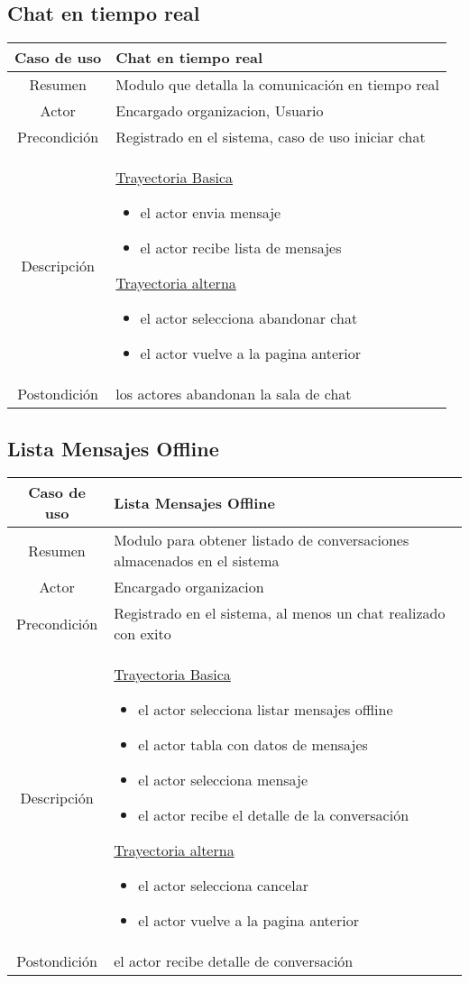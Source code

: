 \documentclass[letterpaper,openright,10pt,oneside]{report}
\begin{document}
\subsection{Chat en tiempo real}

\begin{tabular}{|c|p{110mm}|}
\hline
	Caso de uso &  Chat en tiempo real\\
\hline
	Resumen & Modulo que detalla la comunicación en tiempo real\\
\hline
	Actor & Encargado organizacion, Usuario\\
\hline
	Precondición & Registrado en el sistema, caso de uso iniciar chat\\
\hline
	Descripción & 
	\underline{Trayectoria Basica}
	\begin{itemize}
		\item el actor envia mensaje
		\item el actor recibe lista de mensajes
	\end{itemize}
	\underline{Trayectoria alterna}
	\begin{itemize}
		\item el actor selecciona abandonar chat
		\item el actor vuelve a la pagina anterior
	\end{itemize}\\
\hline
	Postondición & los actores abandonan la sala de chat\\
\hline
\end{tabular}

\subsection{Lista Mensajes Offline}

\begin{tabular}{|c|p{110mm}|}
\hline
	Caso de uso & Lista Mensajes Offline\\
\hline
	Resumen & Modulo para obtener listado de conversaciones almacenados en el sistema\\
\hline
	Actor & Encargado organizacion\\
\hline
	Precondición & Registrado en el sistema, al menos un chat realizado con exito\\
\hline
	Descripción & 
	\underline{Trayectoria Basica}
	\begin{itemize}
		\item el actor selecciona listar mensajes offline
		\item el actor tabla con datos de mensajes
		\item el actor selecciona mensaje
		\item el actor recibe el detalle de la conversación
	\end{itemize}
	\underline{Trayectoria alterna}
	\begin{itemize}
		\item el actor selecciona cancelar
		\item el actor vuelve a la pagina anterior
	\end{itemize}\\
\hline
	Postondición & el actor recibe detalle de conversación\\
\hline
\end{tabular}
\end{document}
